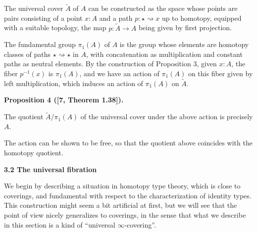 \documentclass[10pt,a4paper]{article}
\begin{document}
 
The universal cover $\tilde{A}$ of $A$ can be constructed as the space whose points are pairs consisting of a point $x:A$ and a path $p:\star\rightsquigarrow x$ up to homotopy, equipped with a suitable topology, the map $p:\tilde{A}\to A$ being given by first projection.\par
 
 
 
 
The fundamental group $\pi_{1}(A)$ of $A$ is the group whose elements are homotopy classes of paths $\star\rightsquigarrow\star$ in $A$, with concatenation as multiplication and constant paths as neutral elements. By the construction of Proposition 3, given $x:A$, the fiber $p^{-1}(x)$ is $\pi_{1}(A)$, and we have an action of $\pi_{1}(A)$ on this fiber given by left multiplication, which induces an action of $\pi_{1}(A)$ on $\tilde{A}$.\par
 
 
 
\par\medskip\noindent\textbf{Proposition 4 ([7, Theorem 1.38]).}\par
 
 
The quotient $\tilde{A}/\pi_{1}(A)$ of the universal cover under the above action is precisely $A$.\par
 
 
 
 
The action can be shown to be free, so that the quotient above coincides with the homotopy quotient.\par
 
 
 
 
\par\medskip\noindent\textbf{3.2 The universal fibration}\par
 
 
We begin by describing a situation in homotopy type theory, which is close to coverings, and fundamental with respect to the characterization of identity types. This construction might seem a bit artificial at first, but we will see that the point of view nicely generalizes to coverings, in the sense that what we describe in this section is a kind of “universal $\infty$-covering”.\par
 
\end{document}
